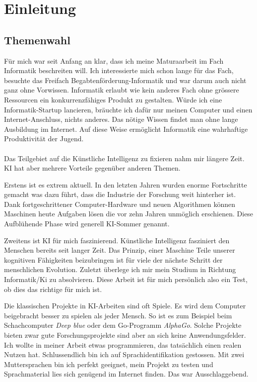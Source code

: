 \section{Einleitung}
\subsection{Themenwahl}
Für mich war seit Anfang an klar, dass ich meine Maturaarbeit im Fach Informatik beschreiten will. Ich interessierte mich schon lange für das Fach, besuchte das Freifach
Begabtenförderung-Informatik  und war darum auch nicht ganz ohne Vorwissen. Informatik erlaubt wie kein anderes Fach ohne grössere Ressourcen ein konkurrenzfähiges Produkt zu 
gestalten. Würde ich eine Informatik-Startup lancieren, bräuchte ich dafür nur meinen Computer und einen Internet-Anschluss, nichts anderes. Das nötige Wissen findet man ohne lange
Ausbildung im Internet. Auf diese Weise ermöglicht Informatik eine wahrhaftige Produktivität der Jugend.
\\ \\ 
Das Teilgebiet auf die Künstliche Intelligenz zu fixieren nahm mir längere Zeit. KI hat aber mehrere Vorteile gegenüber anderen Themen. 

Erstens ist es extrem aktuell. In den letzten Jahren wurden enorme Fortschritte gemacht was dazu führt, dass die Industrie der Forschung weit hinterher ist. Dank fortgeschrittener
Computer-Hardware und neuen Algorithmen können Maschinen heute Aufgaben lösen die vor zehn Jahren unmöglich erschienen. Diese Aufblühende Phase wird generell KI-Sommer
genannt.

Zweitens ist KI für mich faszinierend. Künstliche Intelligenz fasziniert den Menschen bereits seit langer Zeit. Das Prinzip, einer Maschine Teile unserer kognitiven Fähigkeiten
beizubringen ist für viele der nächste Schritt der menschlichen Evolution.
Zuletzt überlege ich mir mein Studium in Richtung Informatik/Ki zu absolvieren. Diese Arbeit ist für mich persönlich also ein Test, ob dies das richtige für mich ist.

Die klassischen Projekte in KI-Arbeiten sind oft Spiele. Es wird dem Computer beigebracht besser zu spielen als jeder Mensch. So ist es zum Beispiel beim Schachcomputer
\textit{Deep blue}\parencite{deepblue} oder dem Go-Programm \textit{AlphaGo}\parencite{alphago}.
Solche Projekte bieten zwar gute Forschungsprojekte sind aber an sich keine Anwendungsfelder. Ich wollte in meiner Arbeit etwas programmieren, das tatsächlich einen realen Nutzen
hat.
Schlussendlich bin ich auf Sprachidentifikation gestossen. Mit zwei Muttersprachen bin ich perfekt geeignet, mein Projekt zu testen und Sprachmaterial lies sich genügend im Internet
finden. Das war Ausschlaggebend.

